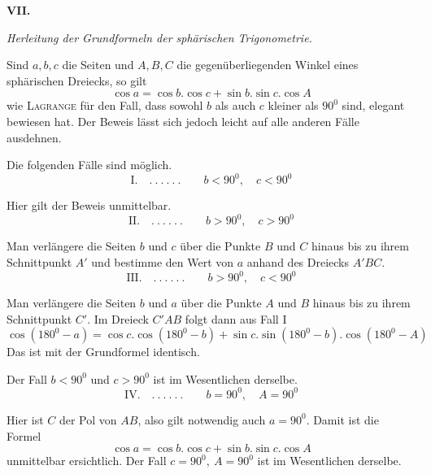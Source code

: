 %
\par\medskip{}
\centerline{\textbf{VII.}}\nobreak\smallskip
\begin{center}\textit{Herleitung der Grundformeln der sphärischen Trigonometrie.}\end{center}
\hspace*{\parindent}Sind \(a,b,c\) die Seiten und \(A,B,C\) die gegenüberliegenden Winkel eines sphärischen Dreiecks, so gilt
\[
\cos a=\cos b.\cos c+\sin b.\sin c.\cos A
\]
wie \textsc{Lagrange} für den Fall, dass sowohl \(b\) als auch \(c\) kleiner als \(90^0\) sind, elegant bewiesen hat. Der Beweis lässt sich jedoch leicht auf alle anderen Fälle ausdehnen.

Die folgenden Fälle sind möglich.
\[
\text{I.}\quad .\ .\ .\ .\ .\ .\qquad b<90^0,\quad c<90^0
\]
\par
Hier gilt der Beweis unmittelbar.
\[
\text{II.}\quad .\ .\ .\ .\ .\ .\qquad b>90^0,\quad c>90^0
\]
\par
Man verlängere die Seiten \(b\) und \(c\) über die Punkte \(B\) und \(C\) hinaus bis zu ihrem Schnittpunkt \(A'\) und bestimme den Wert von \(a\) anhand des Dreiecks \(A'BC\).
\[
\text{III.}\quad .\ .\ .\ .\ .\ .\qquad b>90^0,\quad c<90^0
\]
\par
Man verlängere die Seiten \(b\) und \(a\) über die Punkte \(A\) und \(B\) hinaus bis zu ihrem Schnittpunkt \(C'\). Im Dreieck \(C'AB\) folgt dann aus Fall I
\[
\cos(180^0-a)=\cos c.\cos(180^0-b)+\sin c.\sin(180^0-b).\cos(180^0-A)
\]
Das ist mit der Grundformel identisch.

Der Fall \(b<90^0\) und \(c>90^0\) ist im Wesentlichen derselbe.
\[
\text{IV.}\quad .\ .\ .\ .\ .\ .\qquad b=90^0,\quad A=90^0
\]
\par
Hier ist \(C\) der Pol von \(AB\), also gilt notwendig auch \(a=90^0\). Damit ist die Formel
\[
\cos a=\cos b.\cos c+\sin b.\sin c.\cos A
\]
unmittelbar ersichtlich. Der Fall \(c=90^0,\ A=90^0\) ist im Wesentlichen derselbe.
